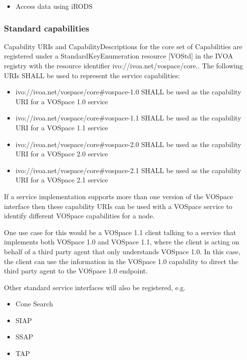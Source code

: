\documentclass[11pt,a4paper]{ivoa}
\begin{document}
\begin{itemize}
    \item Access data using iRODS
\end{itemize}

\subsubsection{Standard capabilities}
Capability URIs and CapabilityDescriptions for the core set of Capabilities are registered under a StandardKeyEnumeration resource [VOStd] in the IVOA registry with the resource identifier ivo://ivoa.net/vospace/core.. The following URIs SHALL be used to represent the service capabilities:

\begin{itemize}
    \item ivo://ivoa.net/vospace/core\#vospace-1.0 SHALL be used as the capability URI for a VOSpace 1.0 service
    \item ivo://ivoa.net/vospace/core\#vospace-1.1 SHALL be used as the capability URI for a VOSpace 1.1 service
    \item ivo://ivoa.net/vospace/core\#vospace-2.0 SHALL be used as the capability URI for a VOSpace 2.0 service
    \item ivo://ivoa.net/vospace/core\#vospace-2.1 SHALL be used as the capability URI for a VOSpace 2.1 service
\end{itemize}
If a service implementation supports more than one version of the VOSpace interface then these capability URIs can be used with a VOSpace service to identify different VOSpace capabilities for a node.

One use case for this would be a VOSpace 1.1 client talking to a service that implements both VOSpace 1.0 and VOSpace 1.1, where the client is acting on behalf of a third party agent that only understands VOSpace 1.0. In this case, the client can use the information in the VOSpace 1.0 capability to direct the third party agent to the VOSpace 1.0 endpoint.

Other standard service interfaces will also be registered, e.g.

\begin{itemize}
    \item Cone Search
    \item SIAP
    \item SSAP
    \item TAP
\end{itemize}
\end{document}
